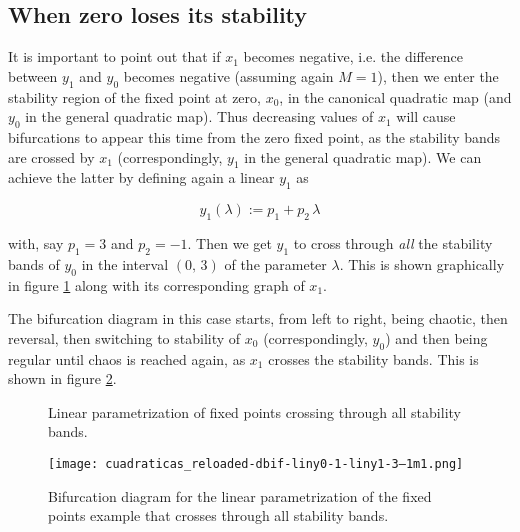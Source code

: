 \documentclass[10pt,twoside,titlepage]{book}
\numberwithin{equation}{chapter}
\numberwithin{figure}{chapter}
\numberwithin{table}{chapter}
\theoremstyle{plain}%
\theoremstyle{definition}
\theoremstyle{remark}
\begin{document}
\FloatBarrier

\subsection{When zero loses its stability}

It is important to point out that if $x_1$ becomes negative, i.e. the difference between $y_1$ and $y_0$ becomes negative (assuming again $M=1$), then we enter the stability region of the fixed point at zero, $x_0$,  in the canonical quadratic map (and $y_0$ in the general quadratic map). Thus decreasing values of $x_1$ will cause bifurcations to appear this time from the zero fixed point, as the stability bands are crossed by $x_1$ (correspondingly, $y_1$ in the general quadratic map). We can achieve the latter by defining again a linear $y_1$ as

\[y_1(\lambda):= p_1 + p_2\,\lambda\]

with, say $p_1=3$ and $p_2=-1$. Then we get $y_1$ to cross through \emph{all} the stability bands of $y_0$ in the interval $(0,\,3)$ of the parameter $\lambda$. This is shown graphically in figure \ref{fig:liny0liny1d} along with its corresponding graph of $x_1$.

The bifurcation diagram in this case starts, from left to right, being chaotic, then reversal, then switching to stability of $x_0$ (correspondingly, $y_0$) and then being regular until chaos is reached again, as $x_1$ crosses the stability bands. This is shown in figure \ref{fig:dbif_liny0liny1d}.
%
\begin{figure}
	\centering
	\caption{Linear parametrization of fixed points crossing through all stability bands.}
	\label{fig:liny0liny1d}
\end{figure}

\begin{figure}
	\centering
	\texttt{[image: cuadraticas\_reloaded-dbif-liny0-1-liny1-3--1m1.png]}
	\caption{Bifurcation diagram for the linear parametrization of the fixed points example that crosses through all stability bands.}
	\label{fig:dbif_liny0liny1d}
\end{figure}
\end{document}
